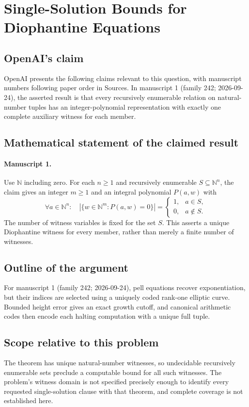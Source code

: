 \documentclass[11pt]{article}
\begin{document}
\section*{Single-Solution Bounds for Diophantine Equations}

\subsection{OpenAI's claim}
OpenAI presents the following claims relevant to this question, with manuscript numbers following paper order in Sources. In manuscript 1 (family 242; 2026-09-24), the asserted result is that every recursively enumerable relation on natural-number tuples has an integer-polynomial representation with exactly one complete auxiliary witness for each member.

\subsection{Mathematical statement of the claimed result}
\paragraph{Manuscript 1.}
Use $\mathbb N$ including zero. For each $n\ge1$ and recursively enumerable $S\subseteq\mathbb N^n$, the claim gives an integer $m\ge1$ and an integral polynomial $P(a,w)$ with
\[
 \forall a\in\mathbb N^n:\quad
 |\{w\in\mathbb N^m:P(a,w)=0\}|=
 \begin{cases}1,&a\in S,\\0,&a\notin S.\end{cases}
\]
The number of witness variables is fixed for the set $S$. This asserts a unique Diophantine witness for every member, rather than merely a finite number of witnesses.

\subsection{Outline of the argument}
For manuscript 1 (family 242; 2026-09-24), pell equations recover exponentiation, but their indices are selected using a uniquely coded rank-one elliptic curve. Bounded height error gives an exact growth cutoff, and canonical arithmetic codes then encode each halting computation with a unique full tuple.

\subsection{Scope relative to this problem}
The theorem has unique natural-number witnesses, so undecidable recursively enumerable sets preclude a computable bound for all such witnesses. The problem's witness domain is not specified precisely enough to identify every requested single-solution clause with that theorem, and complete coverage is not established here.
\end{document}

